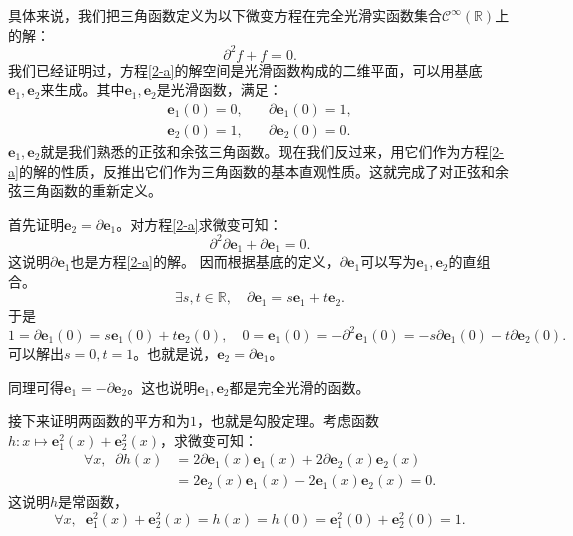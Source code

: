 \documentclass[12pt,UTF8,fontset=none]{ctexbook}
\begin{document}
\begin{appendix}
具体来说，我们把三角函数定义为以下微变方程在完全光滑实函数集合$\mathcal{C}^{\infty}(\mathbb{R})$上的解：
\begin{equation}
    \partial^2 f + f = 0. \label{2-a}
\end{equation}
我们已经证明过，方程\eqref{2-a}的解空间是光滑函数构成的二维平面，可以用基底$\mathbf{e}_1, \mathbf{e}_2$来生成。其中$\mathbf{e}_1, \mathbf{e}_2$是光滑函数，满足：
$$
\begin{array}{ll}
    \mathbf{e}_1(0) = 0, &\quad \partial \mathbf{e}_1(0) = 1, \\
    \mathbf{e}_2(0) = 1, &\quad \partial \mathbf{e}_2(0) = 0.
\end{array}
$$
$\mathbf{e}_1, \mathbf{e}_2$就是我们熟悉的正弦和余弦三角函数。现在我们反过来，用它们作为方程\eqref{2-a}的解的性质，反推出它们作为三角函数的基本直观性质。这就完成了对正弦和余弦三角函数的重新定义。

首先证明$\mathbf{e}_2 = \partial \mathbf{e}_1$。对方程\eqref{2-a}求微变可知：
$$ \partial^2 \partial \mathbf{e}_1 + \partial \mathbf{e}_1 = 0. $$
这说明$\partial \mathbf{e}_1$也是方程\eqref{2-a}的解。
因而根据基底的定义，$\partial \mathbf{e}_1$可以写为$\mathbf{e}_1, \mathbf{e}_2$的直组合。
$$ \exists s, t \in \mathbb{R}, \quad \partial \mathbf{e}_1 = s\mathbf{e}_1 + t\mathbf{e}_2. $$
于是
$$ 1 = \partial \mathbf{e}_1(0) = s\mathbf{e}_1(0) + t\mathbf{e}_2(0), \quad 0 = \mathbf{e}_1(0) = -\partial^2 \mathbf{e}_1(0) = -s\partial \mathbf{e}_1(0) - t\partial \mathbf{e}_2(0). $$
可以解出$s = 0, t = 1$。也就是说，$\mathbf{e}_2 = \partial \mathbf{e}_1$。

同理可得$\mathbf{e}_1 = -\partial \mathbf{e}_2$。这也说明$\mathbf{e}_1, \mathbf{e}_2$都是完全光滑的函数。

接下来证明两函数的平方和为$1$，也就是勾股定理。考虑函数$h: x\mapsto \mathbf{e}_1^2(x) + \mathbf{e}_2^2(x)$，求微变可知：
\begin{align*}
    \forall x, \;\; \partial h(x) &= 2 \partial \mathbf{e}_1(x)\mathbf{e}_1(x) + 2\partial \mathbf{e}_2(x)\mathbf{e}_2(x) \\
    &= 2 \mathbf{e}_2(x)\mathbf{e}_1(x) - 2 \mathbf{e}_1(x)\mathbf{e}_2(x) = 0.
\end{align*}
这说明$h$是常函数，
$$\forall x, \;\; \mathbf{e}_1^2(x) + \mathbf{e}_2^2(x) = h(x) = h(0) = \mathbf{e}_1^2(0) + \mathbf{e}_2^2(0) = 1. $$


\end{appendix}
\end{document}
